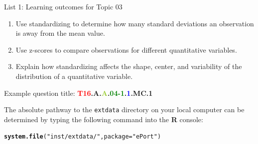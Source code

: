 \documentclass[11pt,a4paper,oldfontcommands,openany]{memoir}
\makeatletter
\newcommand{\hlstr}[1]{\textcolor[rgb]{0.192,0.494,0.8}{#1}}%
\newcommand{\hlstd}[1]{\textcolor[rgb]{0.345,0.345,0.345}{#1}}%
\newcommand{\hlkwc}[1]{\textcolor[rgb]{0.333,0.667,0.333}{#1}}%
\newcommand{\hlkwd}[1]{\textcolor[rgb]{0.737,0.353,0.396}{\textbf{#1}}}%
\newenvironment{kframe}{%
 \def\at@end@of@kframe{}%
 \ifinner\ifhmode%
  \def\at@end@of@kframe{\end{minipage}}%
  \begin{minipage}{\columnwidth}%
 \fi\fi%
 \def\FrameCommand##1{\hskip\@totalleftmargin \hskip-\fboxsep
 \colorbox{shadecolor}{##1}\hskip-\fboxsep
     \hskip-\linewidth \hskip-\@totalleftmargin \hskip\columnwidth}%
 \MakeFramed {\advance\hsize-\width
   \@totalleftmargin\z@ \linewidth\hsize
   \@setminipage}}%
 {\par\unskip\endMakeFramed%
 \at@end@of@kframe}
\newenvironment{knitrout}{}{} %
\numberwithin{equation}{section} %
\makeatother
\begin{document}
\centerline{List 1: Learning outcomes for Topic 03}
\vspace{-2mm}
\begin{framed}
\begin{enumerate}[label=\Alph*.]
\label{sec:lo}
\item Use standardizing to determine how many standard deviations an observation is away from the mean value.
\item Use z-scores to compare observations for different quantitative variables.
\item Explain how standardizing affects the shape, center, and variability of the distribution of a quantitative variable.
\end{enumerate}
\end{framed}

\begin{framed}
Example question title: \textbf{\textcolor{Red}{T16}.\textcolor{YellowOrange}{A}.\textcolor{YellowGreen}{A}.\textcolor{Green}{04-1}.\textcolor{blue}{1}.\textcolor{RedViolet}{MC}.\textcolor{VioletRed}{1}}
\end{framed}

The absolute pathway to the \texttt{extdata} directory on your local computer can be determined by typing the following command into the \textbf{\textsf{R}} console: \\

\begin{knitrout}
\color{fgcolor}\begin{kframe}
\begin{alltt}
\hlkwd{system.file}\hlstd{(}\hlstr{"inst/extdata/"}\hlstd{,} \hlkwc{package} \hlstd{=} \hlstr{"ePort"}\hlstd{)}
\end{alltt}
\end{kframe}
\end{knitrout}
\end{document}
